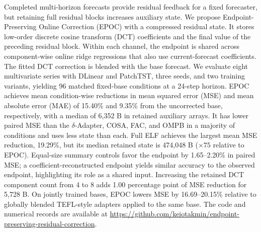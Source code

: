 Completed multi-horizon forecasts provide residual feedback for a fixed forecaster, but retaining full residual blocks increases auxiliary state. We propose Endpoint-Preserving Online Correction (EPOC) with a compressed residual state. It stores low-order discrete cosine transform (DCT) coefficients and the final value of the preceding residual block. Within each channel, the endpoint is shared across component-wise online ridge regressions that also use current-forecast coefficients. The fitted DCT correction is blended with the base forecast. We evaluate eight multivariate series with DLinear and PatchTST, three seeds, and two training variants, yielding 96 matched fixed-base conditions at a 24-step horizon. EPOC achieves mean condition-wise reductions in mean squared error (MSE) and mean absolute error (MAE) of 15.40\% and 9.35\% from the uncorrected base, respectively, with a median of 6,352 B in retained auxiliary arrays. It has lower paired MSE than the $\delta$-Adapter, COSA, FAC, and OMPB in a majority of conditions and uses less state than each. Full ELF achieves the largest mean MSE reduction, 19.29\%, but its median retained state is 474,048 B ($\times75$ relative to EPOC). Equal-size summary controls favor the endpoint by 1.65--2.20\% in paired MSE; a coefficient-reconstructed endpoint yields similar accuracy to the observed endpoint, highlighting its role as a shared input. Increasing the retained DCT component count from 4 to 8 adds 1.00 percentage point of MSE reduction for 5,728 B. On jointly trained bases, EPOC lowers MSE by 16.69--20.15\% relative to globally blended TEFL-style adapters applied to the same base. The code and numerical records are available at \url{https://github.com/keiotakmin/endpoint-preserving-residual-correction}.
